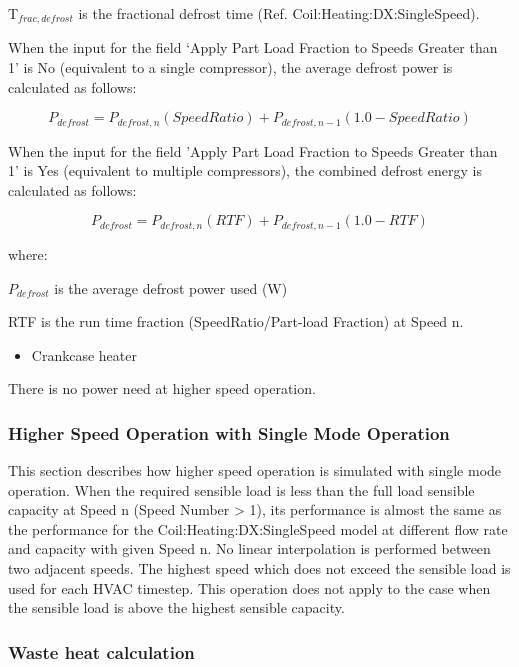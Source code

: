 T\(_{frac,defrost}\) is the fractional defrost time (Ref. Coil:Heating:DX:SingleSpeed).

When the input for the field `Apply Part Load Fraction to Speeds Greater than 1' is No (equivalent to a single compressor), the average defrost power is calculated as follows:

\begin{equation}
{P_{defrost}} = {P_{defrost,n}}(SpeedRatio) + {P_{defrost,n - 1}}(1.0 - SpeedRatio)
\end{equation}

When the input for the field 'Apply Part Load Fraction to Speeds Greater than 1' is Yes (equivalent to multiple compressors), the combined defrost energy is calculated as follows:

\begin{equation}
{P_{defrost}} = {P_{defrost,n}}(RTF) + {P_{defrost,n - 1}}(1.0 - RTF)
\end{equation}

where:

\({P_{defrost}}\) is the average defrost power used (W)

RTF is the run time fraction (SpeedRatio/Part-load Fraction) at Speed n.

\begin{itemize}
  \item Crankcase heater
\end{itemize}

There is no power need at higher speed operation.

\subsubsection{Higher Speed Operation with Single Mode Operation}\label{higher-speed-operation-with-single-mode-operation-1}

This section describes how higher speed operation is simulated with single mode operation. When the required sensible load is less than the full load sensible capacity at Speed n (Speed Number \textgreater{} 1), its performance is almost the same as the performance for the Coil:Heating:DX:SingleSpeed model at different flow rate and capacity with given Speed n. No linear interpolation is performed between two adjacent speeds. The highest speed which does not exceed the sensible load is used for each HVAC timestep. This operation does not apply to the case when the sensible load is above the highest sensible capacity.

\subsubsection{Waste heat calculation}\label{waste-heat-calculation-1-000}

